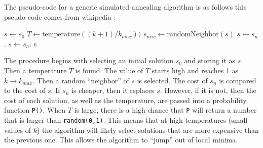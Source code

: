 \documentclass{article}
\newenvironment{Figure}
    {\par\medskip\noindent\minipage{\linewidth}}
    {\endminipage\par\medskip}
\def\code#1{\texttt{#1}}
\begin{document}
\begin{multicols}{2}
        The pseudo-code for a generic simulated annealing algorithm is as follows this pseudo-code comes from wikipedia \cite{wikiAnn}:

        \begin{Figure}
            \label{anneal}

                \begin{algorithmic}[1]
                \STATE $\textit{s} \gets s_0$
                \STATE $T \gets \text{temperature}((k+1)/k_{max}))$
                \STATE $s_{new} \gets $randomNeighbor$(s)$
                \STATE $s \gets s_n$.
                \STATE $s \gets s_n$.
                \ENDIF
                \ENDFOR
                \RETURN s
            \end{algorithmic}

        \end{Figure}

        The procedure begins with selecting an initial solution $s_0$ and storing it as $s$. Then a temperature $T$ is found. The value of $T$ starts high and reaches 1 as $k \rightarrow k_{max}$. Then a random ``neighbor'' of $s$ is selected. The cost of $s_n$ is compared to the cost of $s$. If $s_n$ is cheaper, then it replaces $s$. However, if it is not, then the cost of each solution, as well as the temperature, are passed into a probability function \code{P()}. When $T$ is large, there is a high chance that \code{P} will return a number that is larger than \code{random(0,1)}. This means that at high temperatures (small values of $k$) the algorithm will likely select solutions that are more expensive than the previous one. This allows the algorithm to ``jump'' out of local minima.


\end{multicols}
\end{document}

